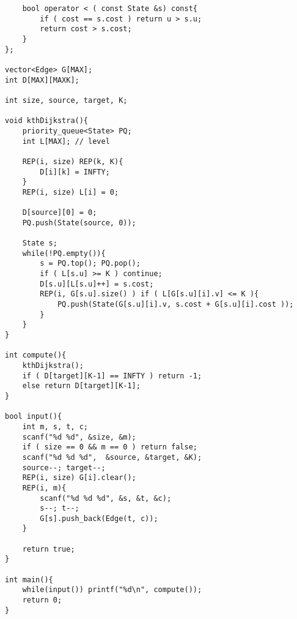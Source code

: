\begin{verbatim}
    bool operator < ( const State &s) const{
        if ( cost == s.cost ) return u > s.u;
        return cost > s.cost;
    }
};

vector<Edge> G[MAX];
int D[MAX][MAXK];

int size, source, target, K;

void kthDijkstra(){
    priority_queue<State> PQ;
    int L[MAX]; // level

    REP(i, size) REP(k, K){
        D[i][k] = INFTY;
    }
    REP(i, size) L[i] = 0;

    D[source][0] = 0;
    PQ.push(State(source, 0));

    State s;
    while(!PQ.empty()){
        s = PQ.top(); PQ.pop();
        if ( L[s.u] >= K ) continue;
        D[s.u][L[s.u]++] = s.cost;
        REP(i, G[s.u].size() ) if ( L[G[s.u][i].v] <= K ){
            PQ.push(State(G[s.u][i].v, s.cost + G[s.u][i].cost ));
        }
    }
}

int compute(){
    kthDijkstra();
    if ( D[target][K-1] == INFTY ) return -1;
    else return D[target][K-1];
}

bool input(){
    int m, s, t, c;
    scanf("%d %d", &size, &m);
    if ( size == 0 && m == 0 ) return false;
    scanf("%d %d %d",  &source, &target, &K);
    source--; target--;
    REP(i, size) G[i].clear();
    REP(i, m){
        scanf("%d %d %d", &s, &t, &c);
        s--; t--;
        G[s].push_back(Edge(t, c));
    }

    return true;
}

int main(){
    while(input()) printf("%d\n", compute());
    return 0;
}
\end{verbatim}